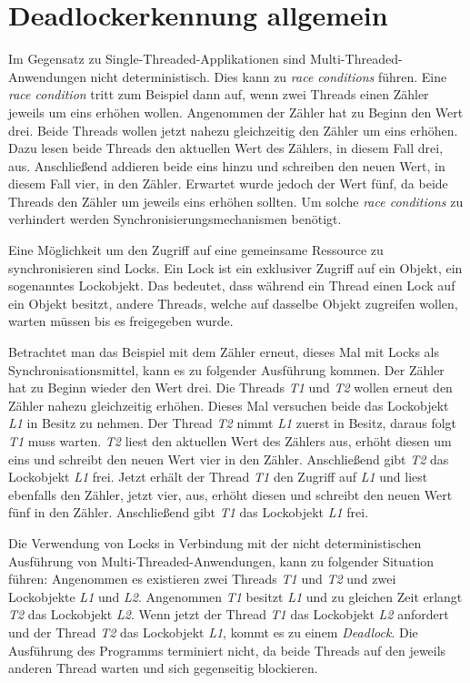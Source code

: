 \section{Deadlockerkennung allgemein}
\label{section:Deadlockerkennung allgemein}
Im Gegensatz zu Single-Threaded-Applikationen sind Multi-Threaded-Anwendungen
nicht deterministisch. Dies kann zu \textit{race conditions} führen. Eine
\textit{race condition} tritt zum Beispiel dann auf, wenn zwei Threads einen
Zähler jeweils um eins erhöhen wollen. Angenommen der Zähler hat zu Beginn den
Wert drei. Beide Threads wollen jetzt nahezu gleichzeitig den Zähler um eins
erhöhen. Dazu lesen beide Threads den aktuellen Wert des Zählers, in diesem Fall
drei, aus. Anschließend addieren beide eins hinzu und schreiben den neuen Wert,
in diesem Fall vier, in den Zähler. Erwartet wurde jedoch der Wert fünf, da
beide Threads den Zähler um jeweils eins erhöhen sollten. Um solche \textit{race
conditions} zu verhindert werden Synchronisierungsmechanismen benötigt.

Eine Möglichkeit um den Zugriff auf eine gemeinsame Ressource zu synchronisieren
sind Locks. Ein Lock ist ein exklusiver Zugriff auf ein Objekt, ein sogenanntes
Lockobjekt. Das bedeutet, dass während ein Thread einen Lock auf ein Objekt
besitzt, andere Threads, welche auf dasselbe Objekt zugreifen wollen, warten
müssen bis es freigegeben wurde.

Betrachtet man das Beispiel mit dem Zähler erneut, dieses Mal mit Locks als
Synchronisationsmittel, kann es zu folgender Ausführung kommen. Der Zähler hat
zu Beginn wieder den Wert drei. Die Threads \textit{T1} und \textit{T2} wollen
erneut den Zähler nahezu gleichzeitig erhöhen. Dieses Mal versuchen beide das
Lockobjekt \textit{L1} in Besitz zu nehmen. Der Thread \textit{T2} nimmt
\textit{L1} zuerst in Besitz, daraus folgt \textit{T1} muss warten. \textit{T2}
liest den aktuellen Wert des Zählers aus, erhöht diesen um eins und schreibt den
neuen Wert vier in den Zähler. Anschließend gibt \textit{T2} das Lockobjekt
\textit{L1} frei. Jetzt erhält der Thread \textit{T1} den Zugriff auf
\textit{L1} und liest ebenfalls den Zähler, jetzt vier, aus, erhöht diesen und
schreibt den neuen Wert fünf in den Zähler. Anschließend gibt \textit{T1} das
Lockobjekt \textit{L1} frei.

Die Verwendung von Locks in Verbindung mit der nicht deterministischen
Ausführung von Multi-Threaded-Anwendungen, kann zu folgender Situation führen:
Angenommen es existieren zwei Threads \textit{T1} und \textit{T2} und zwei
Lockobjekte \textit{L1} und \textit{L2}. Angenommen \textit{T1} besitzt
\textit{L1} und zu gleichen Zeit erlangt \textit{T2} das Lockobjekt \textit{L2}.
Wenn jetzt der Thread \textit{T1} das Lockobjekt \textit{L2} anfordert und der
Thread \textit{T2} das Lockobjekt \textit{L1}, kommt es zu einem
\textit{Deadlock}. Die Ausführung des Programms terminiert nicht, da beide
Threads auf den jeweils anderen Thread warten und sich gegenseitig blockieren.

